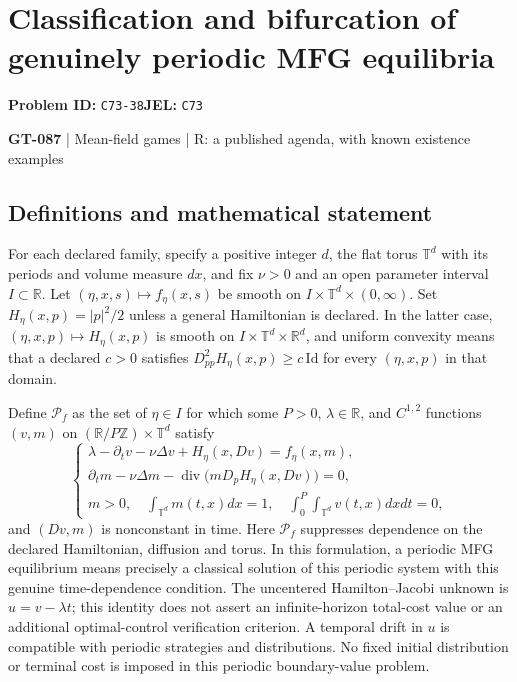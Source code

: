 \documentclass[11pt,a4paper]{article}
\begin{document}
\section*{Classification and bifurcation of genuinely periodic MFG equilibria}
\textbf{Problem ID:} \texttt{C73-38}\quad \textbf{JEL:} \texttt{C73}\par
\label{problem:OP-0217}
\label{game:GT-087}
{\sffamily\small\color{muted}
{\small\textbf{GT-087} | Mean-field games | R: a published agenda, with known existence examples\par}
\par}
\subsection*{Definitions and mathematical statement}
For each declared family, specify a positive integer $d$, the flat torus $\mathbb T^d$ with its periods and volume measure $dx$, and fix $\nu>0$ and an open parameter interval $I\subset\mathbb R$. Let $(\eta,x,s)\mapsto f_\eta(x,s)$ be smooth on $I\times\mathbb T^d\times(0,\infty)$. Set $H_\eta(x,p)=|p|^2/2$ unless a general Hamiltonian is declared. In the latter case, $(\eta,x,p)\mapsto H_\eta(x,p)$ is smooth on $I\times\mathbb T^d\times\mathbb R^d$, and uniform convexity means that a declared $c>0$ satisfies $D_{pp}^2H_\eta(x,p)\geq c\,\mathrm{Id}$ for every $(\eta,x,p)$ in that domain.

Define $\mathcal P_f$ as the set of $\eta\in I$ for which some $P>0$, $\lambda\in\mathbb R$, and $C^{1,2}$ functions $(v,m)$ on $(\mathbb R/P\mathbb Z)\times\mathbb T^d$ satisfy
\[
 \begin{cases}
 \lambda-\partial_t v-\nu\Delta v+H_\eta(x,Dv)=f_\eta(x,m),\\
 \partial_t m-\nu\Delta m-
     \operatorname{div}\big(mD_pH_\eta(x,Dv)\big)=0,\\
 m>0,\quad\displaystyle\int_{\mathbb T^d}m(t,x)dx=1,
 \quad\displaystyle\int_0^P\int_{\mathbb T^d}v(t,x)dxdt=0,
 \end{cases}
\]
and $(Dv,m)$ is nonconstant in time. Here $\mathcal P_f$ suppresses dependence on the declared Hamiltonian, diffusion and torus. In this formulation, a periodic MFG equilibrium means precisely a classical solution of this periodic system with this genuine time-dependence condition. The uncentered Hamilton--Jacobi unknown is $u=v-\lambda t$; this identity does not assert an infinite-horizon total-cost value or an additional optimal-control verification criterion. A temporal drift in $u$ is compatible with periodic strategies and distributions. No fixed initial distribution or terminal cost is imposed in this periodic boundary-value problem.
\end{document}

